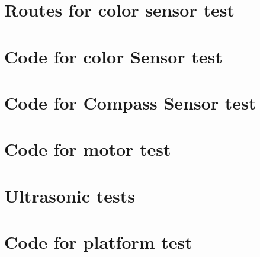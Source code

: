 \appendix
\chapter{Routes for color sensor test}
\label{colorTestAppendix}

\chapter{Code for color Sensor test}
\label{appColorTestCode}

\chapter{Code for Compass Sensor test}
\label{appCompasTestCode}

\chapter{Code for motor test}
\label{appMotorTestCode}

\chapter{Ultrasonic tests}

\chapter{Code for platform test}
\label{platformtest}





\listoffigures
\listoftables
\lstlistoflistings



